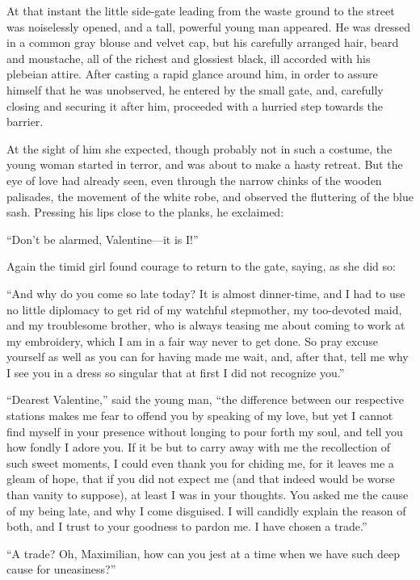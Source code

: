 At that instant the little side-gate leading from the waste ground to
the street was noiselessly opened, and a tall, powerful young man
appeared. He was dressed in a common gray blouse and velvet cap, but
his carefully arranged hair, beard and moustache, all of the richest
and glossiest black, ill accorded with his plebeian attire. After
casting a rapid glance around him, in order to assure himself that he
was unobserved, he entered by the small gate, and, carefully closing
and securing it after him, proceeded with a hurried step towards the
barrier.

At the sight of him she expected, though probably not in such a
costume, the young woman started in terror, and was about to make a
hasty retreat. But the eye of love had already seen, even through the
narrow chinks of the wooden palisades, the movement of the white robe,
and observed the fluttering of the blue sash. Pressing his lips close
to the planks, he exclaimed:

“Don’t be alarmed, Valentine—it is I!”

Again the timid girl found courage to return to the gate, saying, as
she did so:

“And why do you come so late today? It is almost dinner-time, and I had
to use no little diplomacy to get rid of my watchful stepmother, my
too-devoted maid, and my troublesome brother, who is always teasing me
about coming to work at my embroidery, which I am in a fair way never
to get done. So pray excuse yourself as well as you can for having made
me wait, and, after that, tell me why I see you in a dress so singular
that at first I did not recognize you.”

“Dearest Valentine,” said the young man, “the difference between our
respective stations makes me fear to offend you by speaking of my love,
but yet I cannot find myself in your presence without longing to pour
forth my soul, and tell you how fondly I adore you. If it be but to
carry away with me the recollection of such sweet moments, I could even
thank you for chiding me, for it leaves me a gleam of hope, that if you
did not expect me (and that indeed would be worse than vanity to
suppose), at least I was in your thoughts. You asked me the cause of my
being late, and why I come disguised. I will candidly explain the
reason of both, and I trust to your goodness to pardon me. I have
chosen a trade.”

“A trade? Oh, Maximilian, how can you jest at a time when we have such
deep cause for uneasiness?”

